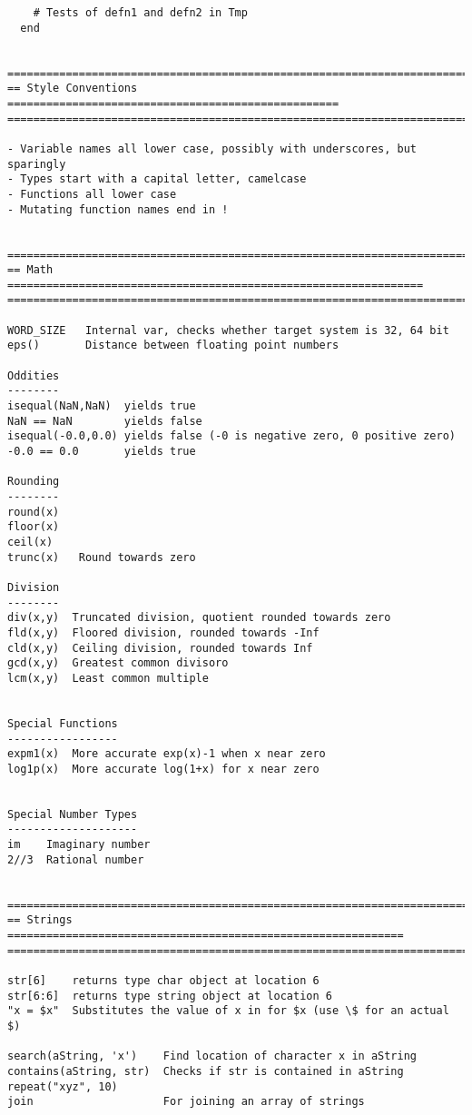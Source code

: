 \documentclass[12pt]{article}
\theoremstyle{plain}
\theoremstyle{definition}
\theoremstyle{remark}
\begin{document}
\begin{lstlisting}
    # Tests of defn1 and defn2 in Tmp
  end


========================================================================
== Style Conventions ===================================================
========================================================================

- Variable names all lower case, possibly with underscores, but sparingly
- Types start with a capital letter, camelcase
- Functions all lower case
- Mutating function names end in !


========================================================================
== Math ================================================================
========================================================================

WORD_SIZE   Internal var, checks whether target system is 32, 64 bit
eps()       Distance between floating point numbers

Oddities
--------
isequal(NaN,NaN)  yields true
NaN == NaN        yields false
isequal(-0.0,0.0) yields false (-0 is negative zero, 0 positive zero)
-0.0 == 0.0       yields true

Rounding
--------
round(x)
floor(x)
ceil(x)
trunc(x)   Round towards zero

Division
--------
div(x,y)  Truncated division, quotient rounded towards zero
fld(x,y)  Floored division, rounded towards -Inf
cld(x,y)  Ceiling division, rounded towards Inf
gcd(x,y)  Greatest common divisoro
lcm(x,y)  Least common multiple


Special Functions
-----------------
expm1(x)  More accurate exp(x)-1 when x near zero
log1p(x)  More accurate log(1+x) for x near zero


Special Number Types
--------------------
im    Imaginary number
2//3  Rational number


========================================================================
== Strings =============================================================
========================================================================

str[6]    returns type char object at location 6
str[6:6]  returns type string object at location 6
"x = $x"  Substitutes the value of x in for $x (use \$ for an actual $)

search(aString, 'x')    Find location of character x in aString
contains(aString, str)  Checks if str is contained in aString
repeat("xyz", 10)
join                    For joining an array of strings


\end{lstlisting}
\end{document}
